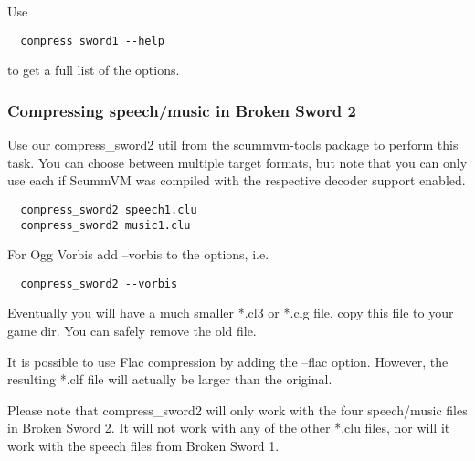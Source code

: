 Use
\begin{verbatim}
  compress_sword1 --help
\end{verbatim}
%
to get a full list of the options.

\subsubsection{Compressing speech/music in Broken Sword 2}

Use our compress\_sword2 util from the scummvm-tools package to perform this
task. You can choose between multiple target formats, but note  that you can
only use each if ScummVM was compiled with the respective decoder support
enabled.

\begin{verbatim}
  compress_sword2 speech1.clu
  compress_sword2 music1.clu
\end{verbatim}
%
For Ogg Vorbis add --vorbis to the options, i.e.
\begin{verbatim}
  compress_sword2 --vorbis
\end{verbatim}
%
Eventually you will have a much smaller *.cl3 or *.clg file, copy this file to
your game dir. You can safely remove the old file.

It is possible to use Flac compression by adding the --flac option. However,
the resulting *.clf file will actually be larger than the original.

Please note that compress\_sword2 will only work with the four speech/music
files in Broken Sword 2. It will not work with any of the other *.clu files,
nor will it work with the speech files from Broken Sword 1.
